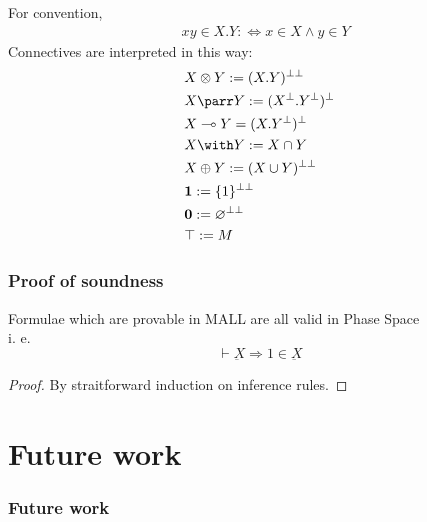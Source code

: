 \documentclass[dvipdfmx,cjk]{beamer}
\theoremstyle{example}
\begin{document}
\begin{frame}
  \begin{definition}
    For convention,
    \begin{align*}
      & xy \in X.Y :\Leftrightarrow x \in X \land y \in Y 
    \end{align*}
    Connectives are interpreted in this way:
    \begin{align*}
     & X \otimes Y := (X.Y)^{\bot\bot} \\
     & X \parr   Y := (X^\bot.Y^\bot)^\bot \\
     & X \multimap Y = (X.Y^\bot)^\bot \\
     & X \with Y := X \cap Y \\
     & X \oplus Y := (X \cup Y)^{\bot\bot} \\
     & \textbf{1} := \{1\}^{\bot\bot} \\
     & \textbf{0} := \varnothing^{\bot\bot} \\
     & \top := M
    \end{align*}
  \end{definition}
\end{frame}

\begin{frame}
  \frametitle{Proof of soundness}
  \begin{theorem}
    Formulae which are provable in MALL are all valid in Phase Space \\
    i. e. \[
        \vdash \underbar{X} \Rightarrow 1 \in \underbar{X}
    \]
        
  \end{theorem}

  \begin{proof}
    By straitforward induction on inference rules.
  \end{proof}
  
\end{frame}

\section{Future work}

\begin{frame}
  \frametitle{Future work}

\end{frame}
                          
\end{document}
